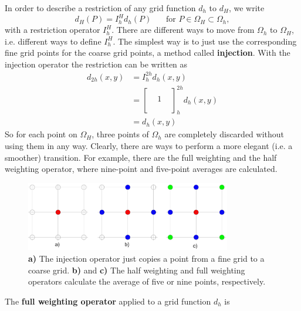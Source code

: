 In order to describe a restriction of any grid function $d_h$ to $d_H$, we write
\begin{equation}
d_H(P) = I_h^H d_h(P)~~~~~~~~ \textrm{for } P \in \Omega_H \subset \Omega_h,
\end{equation}
with a restriction operator $I_h^H$. There are different ways to move from $\Omega_h$ to $\Omega_H$, i.e. different ways to define $I_h^H$. The simplest way is to just use the corresponding fine grid points for the coarse grid points, a method called \textbf{injection}.  With the injection operator the restriction can be written as 
\begin{align}
d_{2h}(x,y) &= I_h^{2h} d_h(x,y)\nonumber \\
&=\begin{bmatrix}
\\
& 1 &\\
\\
\end{bmatrix}_h^{2h} d_h(x,y) \\
& = d_h(x,y) \nonumber
\end{align}
So for each point on $\Omega_H$, three points of $\Omega_h$ are completely discarded without using them in any way. Clearly, there are ways to perform a more elegant (i.e. a smoother) transition. For example, there are the full weighting and the half weighting operator, where nine-point and five-point averages are calculated. 


\begin{figure}[h]
	\centering
	\includegraphics[width=0.8\textwidth]{chapters/chapter02/mg_restriction_operators}
	\caption{\textbf{a)} The injection operator just copies a point from a fine grid to a coarse grid. \textbf{b)} and \textbf{c)} The half weighting and full weighting operators calculate the average of five or nine points, respectively. }
	\label{fig:mg_restriktion_op}
\end{figure}

The \textbf{full weighting operator} applied to a grid function $d_h$ is

